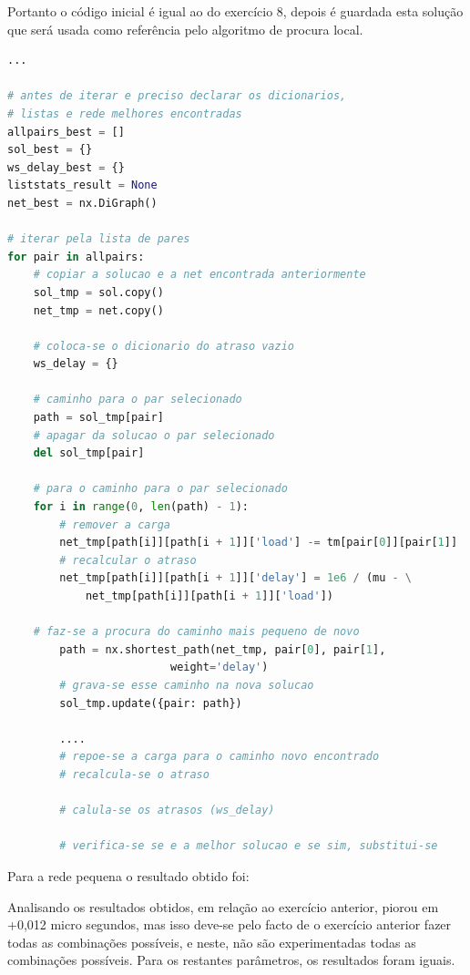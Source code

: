 \documentclass[pdftex,12pt,a4paper]{report}
\begin{document}
Portanto o código inicial é igual ao do exercício 8, depois é guardada esta solução que será usada como referência pelo algoritmo de procura local. 

\begin{lstlisting}[language=python]
...

# antes de iterar e preciso declarar os dicionarios, 
# listas e rede melhores encontradas
allpairs_best = []
sol_best = {}
ws_delay_best = {}
liststats_result = None
net_best = nx.DiGraph()

# iterar pela lista de pares
for pair in allpairs:
	# copiar a solucao e a net encontrada anteriormente
	sol_tmp = sol.copy()
    net_tmp = net.copy()
    
    # coloca-se o dicionario do atraso vazio
    ws_delay = {}
	
	# caminho para o par selecionado
    path = sol_tmp[pair]
    # apagar da solucao o par selecionado
    del sol_tmp[pair]
    
    # para o caminho para o par selecionado
    for i in range(0, len(path) - 1):
    	# remover a carga
        net_tmp[path[i]][path[i + 1]]['load'] -= tm[pair[0]][pair[1]]
        # recalcular o atraso
        net_tmp[path[i]][path[i + 1]]['delay'] = 1e6 / (mu - \
        	net_tmp[path[i]][path[i + 1]]['load'])
		
	# faz-se a procura do caminho mais pequeno de novo
    	path = nx.shortest_path(net_tmp, pair[0], pair[1],
    					 weight='delay')
    	# grava-se esse caminho na nova solucao
    	sol_tmp.update({pair: path})		
    	
    	....
    	# repoe-se a carga para o caminho novo encontrado
    	# recalcula-se o atraso
    	
    	# calula-se os atrasos (ws_delay)
    	
    	# verifica-se se e a melhor solucao e se sim, substitui-se
\end{lstlisting}

Para a rede pequena o resultado obtido foi:







Analisando os resultados obtidos, em relação ao exercício anterior, piorou em +0,012 micro segundos, mas isso deve-se pelo facto de o exercício anterior fazer todas as combinações possíveis, e neste, não são experimentadas todas as combinações possíveis. Para os restantes parâmetros, os resultados foram iguais.
\end{document}
